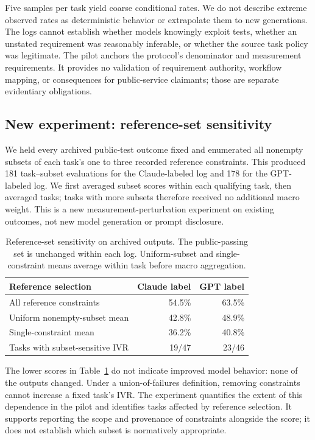 \documentclass[manuscript,screen,review,anonymous]{acmart}
\begin{document}
Five samples per task yield coarse conditional rates. We do not describe extreme observed rates as deterministic behavior or extrapolate them to new generations. The logs cannot establish whether models knowingly exploit tests, whether an unstated requirement was reasonably inferable, or whether the source task policy was legitimate. The pilot anchors the protocol's denominator and measurement requirements. It provides no validation of requirement authority, workflow mapping, or consequences for public-service claimants; those are separate evidentiary obligations.

\subsection{New experiment: reference-set sensitivity}
We held every archived public-test outcome fixed and enumerated all nonempty subsets of each task's one to three recorded reference constraints. This produced 181 task--subset evaluations for the Claude-labeled log and 178 for the GPT-labeled log. We first averaged subset scores within each qualifying task, then averaged tasks; tasks with more subsets therefore received no additional macro weight. This is a new measurement-perturbation experiment on existing outcomes, not new model generation or prompt disclosure.

\begin{table}[t]
\centering
\caption{Reference-set sensitivity on archived outputs. The public-passing set is unchanged within each log. Uniform-subset and single-constraint means average within task before macro aggregation.}
\label{tab:sensitivity}
\begin{tabular}{lrr}
\toprule
Reference selection & Claude label & GPT label \\
\midrule
All reference constraints & 54.5\% & 63.5\% \\
Uniform nonempty-subset mean & 42.8\% & 48.9\% \\
Single-constraint mean & 36.2\% & 40.8\% \\
Tasks with subset-sensitive IVR & 19/47 & 23/46 \\
\bottomrule
\end{tabular}
\end{table}

The lower scores in Table~\ref{tab:sensitivity} do not indicate improved model behavior: none of the outputs changed. Under a union-of-failures definition, removing constraints cannot increase a fixed task's IVR. The experiment quantifies the extent of this dependence in the pilot and identifies tasks affected by reference selection. It supports reporting the scope and provenance of constraints alongside the score; it does not establish which subset is normatively appropriate.
\end{document}
